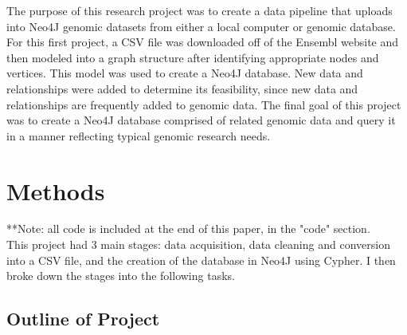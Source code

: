 \documentclass[]{article}
\begin{document}
The purpose of this research project was to create a data pipeline that uploads into Neo4J genomic datasets from either a local computer or genomic database. For this first project, a CSV file was downloaded off of the Ensembl website and then modeled into a graph structure after identifying appropriate nodes and vertices. This model was used to create a Neo4J database. New data and relationships were added to determine its feasibility, since new data and relationships are frequently added to genomic data. The final goal of this project was to create a Neo4J database comprised of related genomic data and query it in a manner reflecting typical genomic research needs.






\section{Methods}
**Note: all code is included at the end of this paper, in the "code" section.\\


This project had 3 main stages: data acquisition, data cleaning and conversion into a CSV file, and the creation of the database in Neo4J using Cypher.  I then broke down the stages into the following tasks.

\subsection{Outline of Project}
\end{document}
